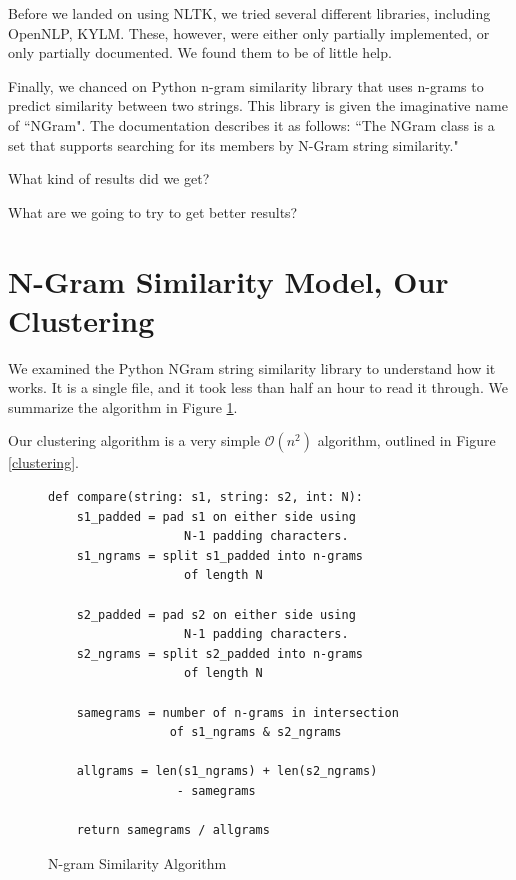 \documentclass{article}
\begin{document}
Before we landed on using NLTK, we tried several different libraries, including OpenNLP, KYLM. These, however, were either only partially implemented, or only partially documented. We found them to be of little help.

Finally, we chanced on Python n-gram similarity library that uses n-grams to predict similarity between two strings. This library is given the imaginative name of ``NGram". The documentation describes it as follows: ``The NGram class is a set that supports searching for its members by N-Gram string similarity." \cite{py_ngram_lib}





What kind of results did we get?

What are we going to try to get better results?


\section{N-Gram Similarity Model, Our Clustering}
We examined the Python NGram string similarity library to understand how it works. It is a single file, and it took less than half an hour to read it through. We summarize the algorithm in Figure \ref{algorithm}.

Our clustering algorithm is a very simple $\mathcal{O}(n^2)$ algorithm, outlined in Figure \ref{clustering}.

\begin{figure}
\begin{verbatim}
def compare(string: s1, string: s2, int: N):
	s1_padded = pad s1 on either side using
				   N-1 padding characters.
	s1_ngrams = split s1_padded into n-grams 
				   of length N
	
	s2_padded = pad s2 on either side using
				   N-1 padding characters.
	s2_ngrams = split s2_padded into n-grams 
				   of length N	
	
	samegrams = number of n-grams in intersection
				 of s1_ngrams & s2_ngrams
	
	allgrams = len(s1_ngrams) + len(s2_ngrams)
			  	  - samegrams
	
	return samegrams / allgrams
\end{verbatim}
\vspace{-20pt}
\caption{N-gram Similarity Algorithm}
\label{algorithm}
\end{figure}
\end{document}
